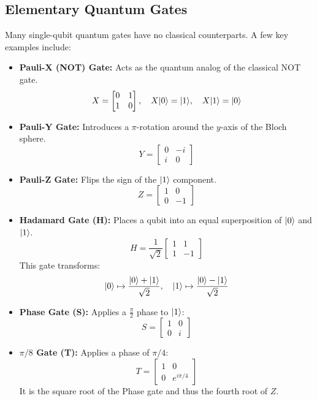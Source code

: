 \documentclass[12pt]{report}
\begin{document}
\subsection{Elementary Quantum Gates}

Many single-qubit quantum gates have no classical counterparts. A few key examples include:

\begin{itemize}
  \item \textbf{Pauli-X (NOT) Gate:} Acts as the quantum analog of the classical NOT gate.
  \[
  X = \begin{bmatrix} 0 & 1 \\ 1 & 0 \end{bmatrix}, \quad X \lvert0\rangle = \lvert1\rangle, \quad X \lvert1\rangle = \lvert0\rangle
  \]
  
  \item \textbf{Pauli-Y Gate:} Introduces a $\pi$-rotation around the $y$-axis of the Bloch sphere.
  \[
  Y = \begin{bmatrix} 0 & -i \\ i & 0 \end{bmatrix}
  \]

  \item \textbf{Pauli-Z Gate:} Flips the sign of the $\lvert1\rangle$ component.
  \[
  Z = \begin{bmatrix} 1 & 0 \\ 0 & -1 \end{bmatrix}
  \]

  \item \textbf{Hadamard Gate (H):} Places a qubit into an equal superposition of $\lvert0\rangle$ and $\lvert1\rangle$.
  \[
  H = \frac{1}{\sqrt{2}} \begin{bmatrix} 1 & 1 \\ 1 & -1 \end{bmatrix}
  \]
  This gate transforms:
  \[
  \lvert0\rangle \mapsto \frac{\lvert0\rangle + \lvert1\rangle}{\sqrt{2}}, \quad \lvert1\rangle \mapsto \frac{\lvert0\rangle - \lvert1\rangle}{\sqrt{2}}
  \]

  \item \textbf{Phase Gate (S):} Applies a $\frac{\pi}{2}$ phase to $\lvert1\rangle$:
  \[
  S = \begin{bmatrix} 1 & 0 \\ 0 & i \end{bmatrix}
  \]

  \item \textbf{$\pi/8$ Gate (T):} Applies a phase of $\pi/4$:
  \[
  T = \begin{bmatrix} 1 & 0 \\ 0 & e^{i\pi/4} \end{bmatrix}
  \]
  It is the square root of the Phase gate and thus the fourth root of $Z$.
\end{itemize}
\end{document}
